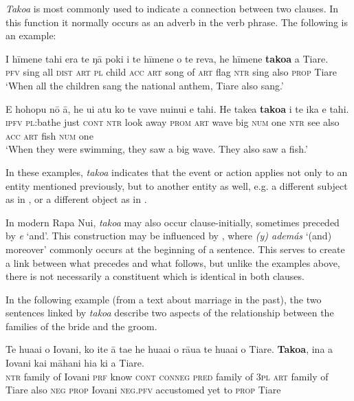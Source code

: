 \textit{Tako{\ꞌ}a} is most commonly used to indicate a connection between two clauses. In this function it normally occurs as an adverb in the verb phrase. The following is an example:

\ea\label{ex:4.132}
\gll I hīmene tahi era te ŋā poki i te hīmene o te reva,  he hīmene \textbf{tako{\ꞌ}a} a Tiare.\\
\textsc{pfv} sing all \textsc{dist} \textsc{art} \textsc{pl} child \textsc{acc} \textsc{art} song of \textsc{art} flag  \textsc{ntr} sing also \textsc{prop} Tiare\\

\glt 
‘When all the children sang the national anthem, Tiare also sang.’ \textstyleExampleref{[R334.340]} 
\z

\ea\label{ex:4.133}
\gll E hohopu nō {\ꞌ}ā, he u{\ꞌ}i atu ko te vave nuinui e tahi.  He take{\ꞌ}a \textbf{tako{\ꞌ}a} i te ika e tahi.\\
\textsc{ipfv} \textsc{pl}:bathe just \textsc{cont} \textsc{ntr} look away \textsc{prom} \textsc{art} wave big \textsc{num} one  \textsc{ntr} see also \textsc{acc} \textsc{art} fish \textsc{num} one\\

\glt
‘When they were swimming, they saw a big wave. They also saw a fish.’ \textstyleExampleref{[R338.003–004]}
\z

In these examples, \textit{tako{\ꞌ}a} indicates that the event or action applies not only to an entity mentioned previously, but to another entity as well, e.g. a different subject as in , or a different object as in .

In modern Rapa Nui, \textit{tako{\ꞌ}a} may also occur clause-initially, sometimes preceded by \textit{{\ꞌ}e} ‘and’. This construction may be influenced by , where \textit{(y) además} ‘(and) moreover’ commonly occurs at the beginning of a sentence. This serves to create a link between what precedes and what follows, but unlike the examples above, there is not necessarily a constituent which is identical in both clauses. 

In the following example (from a text about marriage in the past), the two sentences linked by \textit{tako}\textit{{\ꞌ}}\textit{a} describe two aspects of the relationship between the families of the bride and the groom.

\ea\label{ex:4.134}
\gll Te hua{\ꞌ}ai o Iovani, ko {\ꞌ}ite {\ꞌ}ā ta{\ꞌ}e he hua{\ꞌ}ai o rāua te hua{\ꞌ}ai o Tiare. \textbf{Tako{\ꞌ}a}, {\ꞌ}ina a Iovani kai māhani hia ki a Tiare. \\
\textsc{ntr} family of Iovani \textsc{prf} know \textsc{cont} \textsc{conneg} \textsc{pred} family of \textsc{3pl} \textsc{art} family of Tiare also \textsc{neg} \textsc{prop} Iovani \textsc{neg.pfv} accustomed yet to \textsc{prop} Tiare \\

